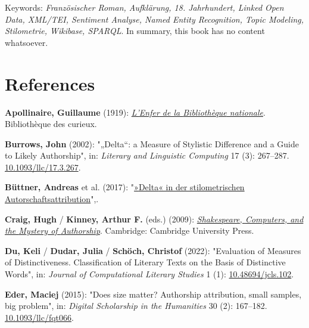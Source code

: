 \documentclass[
  12pt,
  letterpaper,
  DIV=11,
  numbers=noendperiod]{scrreprt}
\newlength{\cslhangindent}
\newenvironment{CSLReferences}[2] %
 {\begin{list}{}{%
  \setlength{\itemindent}{0pt}
  \setlength{\leftmargin}{0pt}
  \setlength{\parsep}{0pt}
  \ifodd #1
   \setlength{\leftmargin}{\cslhangindent}
   \setlength{\itemindent}{-1\cslhangindent}
  \fi
  \setlength{\itemsep}{#2\baselineskip}}}
 {\end{list}}
\begin{document}
Keywords: \emph{Französischer Roman, Aufklärung, 18. Jahrhundert, Linked
Open Data, XML/TEI, Sentiment Analyse, Named Entity Recognition, Topic
Modeling, Stilometrie, Wikibase, SPARQL}. In summary, this book has no
content whatsoever.


\chapter*{References}\label{references}


\label{refs}
\begin{CSLReferences}{1}{0}
\textbf{Apollinaire, Guillaume} (1919):
\emph{\href{https://fr.wikisource.org/wiki/Livre:Apollinaire_-_L\%E2\%80\%99Enfer_de_la_Biblioth\%C3\%A8que_nationale.djvu}{L'{Enfer}
de la {Bibliothèque} nationale}}. Bibliothèque des curieux.

\textbf{Burrows, John} (2002): "{„{Delta}``}: a {Measure} of {Stylistic}
{Difference} and a {Guide} to {Likely} {Authorship}", in: \emph{Literary
and Linguistic Computing} 17 (3): 267--287.
\href{https://doi.org/10.1093/llc/17.3.267}{10.1093/llc/17.3.267}.

\textbf{Büttner, Andreas} et al. (2017):
"\href{http://dx.doi.org/10.17175/2017_006}{»{Delta}« in der
stilometrischen {Autorschaftsattribution}}",.

\textbf{Craig, Hugh} / \textbf{Kinney, Arthur F.} (eds.) (2009):
\emph{\href{https://doi.org/10.1017/CBO9780511605437}{Shakespeare,
{Computers}, and the {Mystery} of {Authorship}}}. Cambridge: Cambridge
University Press.

\textbf{Du, Keli} / \textbf{Dudar, Julia} / \textbf{Schöch, Christof}
(2022): "Evaluation of {Measures} of {Distinctiveness}. {Classification}
of {Literary} {Texts} on the {Basis} of {Distinctive} {Words}", in:
\emph{Journal of Computational Literary Studies} 1 (1):
\href{https://doi.org/10.48694/jcls.102}{10.48694/jcls.102}.

\textbf{Eder, Maciej} (2015): "Does size matter? {Authorship}
attribution, small samples, big problem", in: \emph{Digital Scholarship
in the Humanities} 30 (2): 167--182.
\href{https://doi.org/10.1093/llc/fqt066}{10.1093/llc/fqt066}.


\end{CSLReferences}
\end{document}
